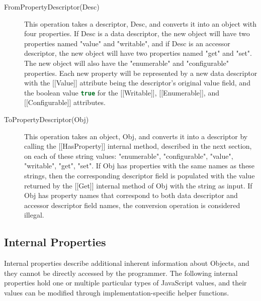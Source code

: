 \documentclass[a4paper,11pt,twoside]{report}
\def\jsinline{\lstinline[language=JavaScript, basicstyle=\small]}%\end{lstlisting}
\begin{document}
\begin{description}
\item[FromPropertyDescriptor(Desc)] This operation takes a descriptor, Desc, and converts it into an object with four properties. If Desc is a data descriptor, the new object will have two properties named "value" and "writable", and if Desc is an accessor descriptor, the new object will have two properties named "get" and "set". The new object will also have the "enumerable" and "configurable" properties. Each new property will be represented by a new data descriptor with the [[Value]] attribute being the descriptor's original value field, and the boolean value \jsinline|true| for the [[Writable]], [[Enumerable]], and [[Configurable]] attributes.

\item[ToPropertyDescriptor(Obj)] This operation takes an object, Obj, and converts it into a descriptor by calling the [[HasProperty]] internal method, described in the next section, on each of these string values: "enumerable", "configurable", "value", "writable", "get", "set". If Obj has properties with the same names as these strings, then the corresponding descriptor field is populated with the value returned by the [[Get]] internal method of Obj with the string as input. If Obj has property names that correspond to both data descriptor and accessor descriptor field names, the conversion operation is considered illegal.
\end{description}

\subsection{Internal Properties}
Internal properties describe additional inherent information about Objects, and they cannot be directly accessed by the programmer. The following internal properties hold one or multiple particular types of JavaScript values, and their values can be modified through implementation-specific helper functions.
\end{document}
